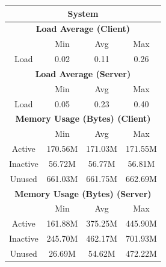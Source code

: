 \documentclass[11pt,a4paper,headinclude=false,footinclude=false]{scrreprt}
\begin{document}
\begin{table}[H]
\centering
    \begin{tabular}{||c|c|c|c|c|c|c||}
    \hline
    \multicolumn{7}{|c|}{\textbf{System}} \\
    \hline
    \multicolumn{7}{|c|}{\textbf{Load Average (Client)}} \\
    \hline\hline
      & \multicolumn{2}{|c|}{Min} & \multicolumn{2}{|c|}{Avg} & \multicolumn{2}{|c|}{Max} \\
    \hline
    Load & \multicolumn{2}{|c|}{0.02} & \multicolumn{2}{|c|}{0.11} & \multicolumn{2}{|c|}{0.26} \\
    \hline\hline
    \multicolumn{7}{|c|}{\textbf{Load Average (Server)}} \\
    \hline\hline
      & \multicolumn{2}{|c|}{Min} & \multicolumn{2}{|c|}{Avg} & \multicolumn{2}{|c|}{Max} \\
    \hline
    Load & \multicolumn{2}{|c|}{0.05} & \multicolumn{2}{|c|}{0.23} & \multicolumn{2}{|c|}{0.40} \\
    \hline\hline
    \multicolumn{7}{|c|}{\textbf{Memory Usage (Bytes) (Client)}} \\
    \hline\hline
      & \multicolumn{2}{|c|}{Min} & \multicolumn{2}{|c|}{Avg} & \multicolumn{2}{|c|}{Max} \\
    \hline
    Active & \multicolumn{2}{|c|}{170.56M} & \multicolumn{2}{|c|}{171.03M} & \multicolumn{2}{|c|}{171.55M} \\
    \hline
    Inactive & \multicolumn{2}{|c|}{56.72M} & \multicolumn{2}{|c|}{56.77M} & \multicolumn{2}{|c|}{56.81M} \\
    \hline
    Unused & \multicolumn{2}{|c|}{661.03M} & \multicolumn{2}{|c|}{661.75M} & \multicolumn{2}{|c|}{662.69M} \\
    \hline\hline
    \multicolumn{7}{|c|}{\textbf{Memory Usage (Bytes) (Server)}} \\
    \hline\hline
      & \multicolumn{2}{|c|}{Min} & \multicolumn{2}{|c|}{Avg} & \multicolumn{2}{|c|}{Max} \\
    \hline
    Active & \multicolumn{2}{|c|}{161.88M} & \multicolumn{2}{|c|}{375.25M} & \multicolumn{2}{|c|}{445.90M} \\
    \hline
    Inactive & \multicolumn{2}{|c|}{245.70M} & \multicolumn{2}{|c|}{462.17M} & \multicolumn{2}{|c|}{701.93M} \\
    \hline
    Unused & \multicolumn{2}{|c|}{26.69M} & \multicolumn{2}{|c|}{54.62M} & \multicolumn{2}{|c|}{472.22M} \\
    \hline\hline

\end{tabular}
\end{table}
\end{document}
